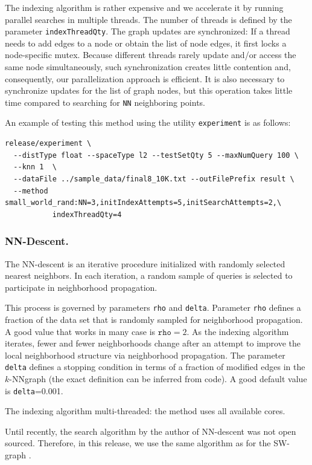 \documentclass[runningheads,a4paper]{llncs}
\newcommand{\ttt}[1]{\texttt{#1}}
\newcommand{\knnns}{$k$-NN}
\begin{document}
The indexing algorithm is rather expensive and we accelerate it by running parallel searches in multiple threads. The number of threads is defined by the parameter \ttt{indexThreadQty}.
The graph updates are synchronized: If a thread  needs to add edges to a node or obtain
the list of node edges, it first locks a node-specific mutex.
Because different threads rarely update and/or access the same node simultaneously,
such synchronization creates little contention and, consequently,
our parallelization approach is efficient.
It is also necessary to synchronize updates for the list of graph nodes, 
but this operation takes little time compared to searching for \ttt{NN} neighboring points.

An example of testing this method using the utility \texttt{experiment} is as follows:
{
\footnotesize
\begin{verbatim}
release/experiment \
  --distType float --spaceType l2 --testSetQty 5 --maxNumQuery 100 \
  --knn 1  \
  --dataFile ../sample_data/final8_10K.txt --outFilePrefix result \
  --method small_world_rand:NN=3,initIndexAttempts=5,initSearchAttempts=2,\
           indexThreadQty=4 
\end{verbatim}
}

\subsubsection{NN-Descent.} \label{SectionNNDescent}
The NN-descent is an iterative procedure initialized with randomly selected
nearest neighbors. In each iteration, a random sample of queries is selected
to participate in neighborhood propagation.

This process is governed by parameters \ttt{rho} and \ttt{delta}. 
Parameter \ttt{rho} defines a fraction of the data set that is randomly
sampled for neighborhood propagation. A good value that works
in many case is $\ttt{rho}=2$. As the indexing algorithm iterates,
fewer and fewer neighborhoods change after an attempt to improve the local
neighborhood structure via neighborhood propagation. 
The parameter \ttt{delta} defines a stopping condition in terms of a fraction
of modified edges in the \knnns graph (the exact definition can be inferred from code). 
A good default value is \ttt{delta}=0.001.

The indexing algorithm multi-threaded: the method uses all available cores.

Until recently, the search algorithm by the author of NN-descent was not open sourced.
Therefore, in this release, we use the same algorithm as for the SW-graph \cite{malkov2012scalable,malkov2014}.
\end{document}
